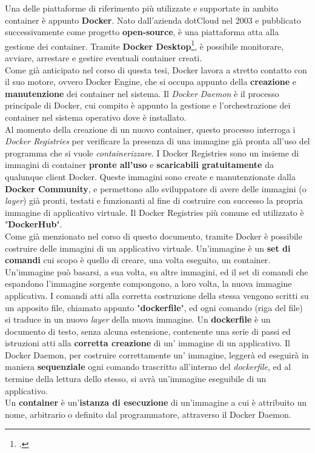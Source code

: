 Una delle piattaforme di riferimento più utilizzate e supportate in ambito container è appunto \textbf{Docker}. Nato dall'azienda dotCloud nel 2003 e pubblicato successivamente come progetto \textbf{\gls{open-source}}, è una piattaforma atta alla gestione dei container. Tramite \textbf{Docker Desktop}\footcite{presente solamente per le versioni Windows}, è possibile monitorare, avviare, arrestare e gestire eventuali container creati. \\
Come già anticipato nel corso di questa tesi, Docker lavora a stretto contatto con il suo motore, ovvero \gls{Docker Engine}, che si occupa appunto della \textbf{creazione} e \textbf{manutenzione} dei container nel sistema.
Il \textit{Docker Daemon} è il processo principale di Docker, cui compito è appunto la gestione e l'orchestrazione dei container nel sistema operativo dove è installato. \\
Al momento della creazione di un nuovo container, questo processo interroga i \textit{Docker Registries} per verificare la presenza di una immagine già pronta all'uso del programma che si vuole \textit{containerizzare}. I Docker Registries sono un insieme di immagini di container \textbf{pronte all'uso} e \textbf{scaricabili gratuitamente} da qualunque client Docker. Queste immagini sono create e manutenzionate dalla \textbf{Docker Community}, e permettono allo sviluppatore di avere delle immagini (o \textit{layer}) già pronti, testati e funzionanti al fine di costruire con successo la propria immagine di applicativo virtuale. Il Docker Registries più comune ed utilizzato è "\textbf{DockerHub}".\\
Come già menzionato nel corso di questo documento, tramite Docker è possibile costruire delle immagini di un applicativo virtuale. Un'immagine è un \textbf{set di comandi} cui scopo è quello di creare, una volta eseguito, un container. Un'immagine può basarsi, a sua volta, su altre immagini, ed il set di comandi che espandono l'immagine sorgente compongono, a loro volta, la nuova immagine applicativa. I comandi atti alla corretta costruzione della stessa vengono scritti su un apposito file, chiamato appunto "\textbf{dockerfile}", ed ogni comando (riga del file) si traduce in un nuovo \textit{layer} della nuova immagine. Un \textbf{dockerfile} è un documento di testo, senza alcuna estensione, contenente una serie di passi ed istruzioni atti alla \textbf{corretta creazione} di un' immagine di un applicativo. Il Docker Daemon, per costruire correttamente un' immagine, leggerà ed eseguirà in maniera \textbf{sequenziale} ogni comando trascritto all'interno del \textit{dockerfile}, ed al termine della lettura dello stesso, si avrà un'immagine eseguibile di un applicativo. \\
Un \textbf{container} è un'\textbf{istanza di esecuzione} di un'immagine a cui è attribuito un nome, arbitrario o definito dal programmatore, attraverso il Docker Daemon. 

